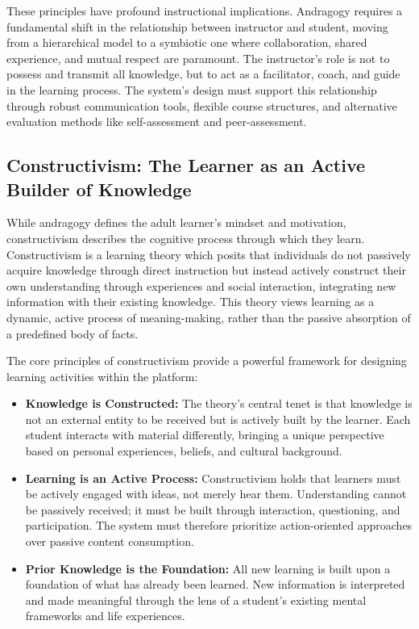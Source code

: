 \documentclass{article}
\begin{document}
These principles have profound instructional implications. Andragogy requires a fundamental shift in the relationship between instructor and student, moving from a hierarchical model to a symbiotic one where collaboration, shared experience, and mutual respect are paramount.\cite{1, 2, 7} The instructor's role is not to possess and transmit all knowledge, but to act as a facilitator, coach, and guide in the learning process.\cite{1, 7} The system's design must support this relationship through robust communication tools, flexible course structures, and alternative evaluation methods like self-assessment and peer-assessment.\cite{7}

\subsection{Constructivism: The Learner as an Active Builder of Knowledge}

While andragogy defines the adult learner's mindset and motivation, constructivism describes the cognitive process through which they learn. Constructivism is a learning theory which posits that individuals do not passively acquire knowledge through direct instruction but instead actively construct their own understanding through experiences and social interaction, integrating new information with their existing knowledge.\cite{12, 13, 14} This theory views learning as a dynamic, active process of meaning-making, rather than the passive absorption of a predefined body of facts.\cite{14, 15}

The core principles of constructivism provide a powerful framework for designing learning activities within the platform:
\begin{itemize}
    \item \textbf{Knowledge is Constructed:} The theory's central tenet is that knowledge is not an external entity to be received but is actively built by the learner.\cite{12, 14} Each student interacts with material differently, bringing a unique perspective based on personal experiences, beliefs, and cultural background.\cite{12}
    \item \textbf{Learning is an Active Process:} Constructivism holds that learners must be actively engaged with ideas, not merely hear them.\cite{12, 15} Understanding cannot be passively received; it must be built through interaction, questioning, and participation.\cite{15, 16} The system must therefore prioritize action-oriented approaches over passive content consumption.
    \item \textbf{Prior Knowledge is the Foundation:} All new learning is built upon a foundation of what has already been learned.\cite{12, 15} New information is interpreted and made meaningful through the lens of a student's existing mental frameworks and life experiences.\cite{12, 17}
\end{itemize}
\end{document}
